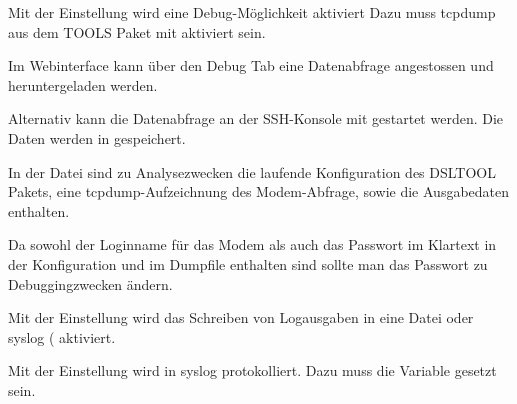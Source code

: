 \begin{description}

  Mit der Einstellung  wird eine Debug-Möglichkeit aktiviert
  Dazu muss tcpdump aus dem TOOLS Paket mit  aktiviert sein.

  Im Webinterface kann über den Debug Tab eine Datenabfrage angestossen
  und heruntergeladen werden.

  Alternativ kann die Datenabfrage an der SSH-Konsole mit
   gestartet werden.
  Die Daten werden in  gespeichert.

  In der Datei  sind zu Analysezwecken die laufende Konfiguration
  des DSLTOOL Pakets, eine tcpdump-Aufzeichnung des Modem-Abfrage, sowie die
  Ausgabedaten enthalten.

  Da sowohl der Loginname für das Modem als auch das Passwort im Klartext in der
  Konfiguration und im Dumpfile enthalten sind sollte man das Passwort zu
  Debuggingzwecken ändern.


  Mit der Einstellung  wird das Schreiben von Logausgaben in eine Datei
  oder syslog ( aktiviert.


  Mit der Einstellung  wird in syslog protokolliert.
  Dazu muss die Variable  gesetzt sein.

\end{description}

